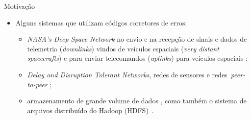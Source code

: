   \begin{frame}{Motivação}
     \begin{itemize}
      \item Alguns sistemas que utilizam códigos corretores de erros:
	\begin{itemize}
            \item \emph{NASA's Deep Space Network} no envio e na recepção de sinais e dados de telemetria
(\emph{downlinks}) vindos de veículos espaciais (\emph{very distant spacecrafts}) e para enviar telecomandos (\emph{uplinks}) para
veículos espaciais \cite{Abrantes:2010, Almeida:2007, STO:2010, TDD:2010};
           \item \emph{Delay and Disruption Tolerant Networks}, redes de sensores e redes~\emph{peer-to-peer} \cite{Bhagwan:2004, Alencar:2004, Haeberlen:2005, Houri:2009,RTAD:2007, Rodrigues:2005, Wilcox-O'Hearn:2008};
           \item armazenamento de grande volume de dados \cite{Anderson:1998,Kubiatowicz:2000,  Saito:2004, Schmuck:2002, Storer:2008,
Storer:2009, Xia:2006}, como também o sistema de arquivos distribuído do Hadoop (HDFS)~\cite{HDFS-503:2010}.
	\end{itemize}
     \end{itemize}
  \end{frame}



